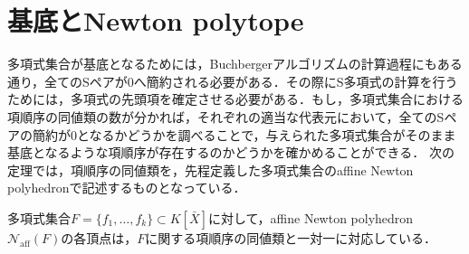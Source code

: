 \section{\groebner{}基底とNewton polytope}
多項式集合が\groebner{}基底となるためには，Buchbergerアルゴリズムの計算過程にもある通り，全てのSペアが$0$へ簡約される必要がある．その際にS多項式の計算を行うためには，多項式の先頭項を確定させる必要がある．もし，多項式集合における項順序の同値類の数が分かれば，それぞれの適当な代表元において，全てのSペアの簡約が$0$となるかどうかを調べることで，与えられた多項式集合がそのまま\groebner{}基底となるような項順序が存在するのかどうかを確かめることができる．
次の定理では，項順序の同値類を，先程定義した多項式集合のaffine Newton polyhedronで記述するものとなっている．
\begin{theorem}
	\label{chapter03:theorem:GBD_main_theorem}
	多項式集合$F = \{f_1, \dots, f_k\} \subset K[\bar{X}]$に対して，affine Newton polyhedron $\mathcal{N}_{\mathrm{aff}}(F)$の各頂点は，$F$に関する項順序の同値類と一対一に対応している．
\end{theorem}

